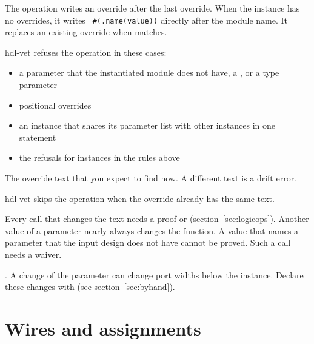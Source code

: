 \begin{entry}{}
\item[Writes] The operation writes an override  after the last
  override. When the instance has no overrides, it writes \texttt{ \#(.name(value))}
  directly after the module name. It replaces an existing override when 
  matches.
\item[Refused] hdl-vet refuses the operation in these cases:
  \begin{itemize}
  \item a parameter that the instantiated module does not have, a , or a
    type parameter
  \item positional overrides
  \item an instance that shares its parameter list with other instances in one statement
  \item the refusals for instances in the rules above
  \end{itemize}
\item[was] The override text that you expect to find now. A different text is a
  drift error.
\item[Again] hdl-vet skips the operation when the override already has the same text.
\item[Waiver] Every call that changes the text needs a proof or 
  (section~\ref{sec:logicops}). Another value of a parameter nearly always changes the
  function. A value that names a parameter that the input design does not have cannot be
  proved. Such a call needs a waiver.
\item[Example] . A change of the parameter can change port widths below
  the instance. Declare these changes with  (see
  section~\ref{sec:byhand}).
\end{entry}



\section{Wires and assignments}

